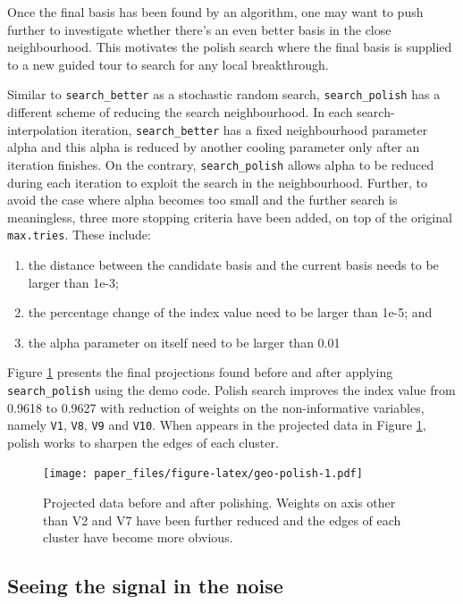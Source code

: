 \documentclass[12pt]{article}
\providecommand{\tightlist}{%
  \setlength{\itemsep}{0pt}\setlength{\parskip}{0pt}}
\begin{document}
Once the final basis has been found by an algorithm, one may want to push further to investigate whether there's an even better basis in the close neighbourhood. This motivates the polish search where the final basis is supplied to a new guided tour to search for any local breakthrough.

Similar to \texttt{search\_better} as a stochastic random search, \texttt{search\_polish} has a different scheme of reducing the search neighbourhood. In each search-interpolation iteration, \texttt{search\_better} has a fixed neighbourhood parameter alpha and this alpha is reduced by another cooling parameter only after an iteration finishes. On the contrary, \texttt{search\_polish} allows alpha to be reduced during each iteration to exploit the search in the neighbourhood. Further, to avoid the case where alpha becomes too small and the further search is meaningless, three more stopping criteria have been added, on top of the original \texttt{max.tries}. These include:

\begin{enumerate}
\def\labelenumi{\arabic{enumi})}
\tightlist
\item
  the distance between the candidate basis and the current basis needs to be larger than 1e-3;
\item
  the percentage change of the index value need to be larger than 1e-5; and
\item
  the alpha parameter on itself need to be larger than 0.01
\end{enumerate}

Figure \ref{geo-polish} presents the final projections found before and after applying \texttt{search\_polish} using the demo code. Polish search improves the index value from 0.9618 to 0.9627 with reduction of weights on the non-informative variables, namely \texttt{V1}, \texttt{V8}, \texttt{V9} and \texttt{V10}. When appears in the projected data in Figure \ref{geo-polish}, polish works to sharpen the edges of each cluster.

\begin{figure}
\centering
\texttt{[image: paper\_files/figure-latex/geo-polish-1.pdf]}
\caption{\label{fig:geo-polish}\label{geo-polish}Projected data before and after polishing. Weights on axis other than V2 and V7 have been further reduced and the edges of each cluster have become more obvious.}
\end{figure}

\hypertarget{seeing-the-signal-in-the-noise}{%
\subsection{Seeing the signal in the noise}\label{seeing-the-signal-in-the-noise}}
\end{document}
